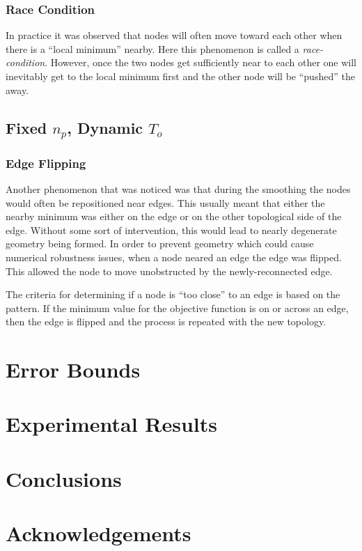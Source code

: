 \documentclass[11pt]{article}
\begin{document}
\subsubsection{Race Condition}
In practice it was observed that nodes will often move toward each other
when there is a ``local minimum'' nearby. Here this phenomenon is called
a {\it race-condition}. However, once the two nodes get sufficiently
near to each other one will inevitably get to the local minimum first
and the other node will be ``pushed'' the away.
\subsection{Fixed $n_p$, Dynamic $T_o$}
\subsubsection{Edge Flipping}
Another phenomenon that was noticed was that during the smoothing the
nodes would often be repositioned near edges. This usually meant that
either the nearby minimum was either on the edge or on the other
topological side of the edge. Without some sort of intervention, this
would lead to nearly degenerate geometry being formed. In order to
prevent geometry which could cause numerical robustness issues, when a
node neared an edge the edge was flipped. This allowed the node to move
unobstructed by the newly-reconnected edge.

The criteria for determining if a node is ``too close'' to an edge is
based on the pattern. If the minimum value for the objective function is
on or across an edge, then the edge is flipped and the process is
repeated with the new topology.

\section{Error Bounds}
\section{Experimental Results}
\section{Conclusions}
\section{Acknowledgements}
\end{document}
